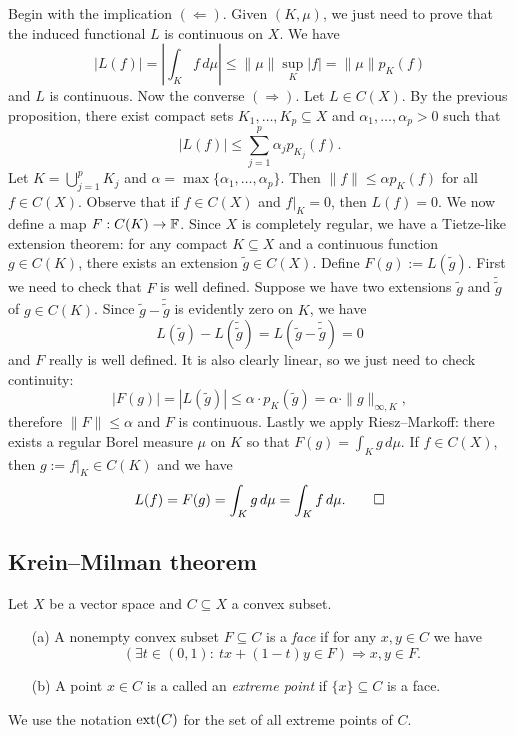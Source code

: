 \begin{myproof}
  Begin with the implication $(\Leftarrow)$. Given $(K, \mu)$, we just need to prove that the induced 
  functional $L$ is continuous on $X$. We have 
  $$|L(f)| = \left| \int_K f\, d\mu \right| \leq \|\mu\| \sup_K |f| = \|\mu\| p_K (f)$$
  and $L$ is continuous. Now the converse $(\Rightarrow)$.
  Let $L \in C(X)$. By the previous proposition, there exist compact sets 
  $K_1, \dots, K_p \subseteq X$ and $\alpha_1, \dots, \alpha_p > 0$ such that 
  $$|L(f)| \leq \sum_{j = 1} ^p \alpha_j p_{K_j} (f).$$
  Let $K = \bigcup_{j = 1} ^p K_j$ and $\alpha = \max \{\alpha_1, \dots, \alpha_p\}$.
  Then $\|f\| \leq \alpha p_K (f)$ for all $f \in C(X)$.
  Observe that if $f \in C(X)$ and $f \big|_K = 0$, then $L(f) = 0$.
  We now define a map $F: C(K) \to \mathbb {F}$. 
  Since $X$ is completely regular, we have a Tietze-like extension theorem: for any compact $K \subseteq X$ and a continuous function $g \in C(K)$,
  there exists an extension $\widetilde{g} \in C(X)$.
  Define $F(g) := L(\widetilde{g})$.
  First we need to check that $F$ is well defined. Suppose we have two extensions $\widetilde{g}$ and $\widetilde{\widetilde{g}}$
  of $g \in C(K)$. Since $\widetilde{g} - \widetilde{\widetilde{g}}$ is evidently zero on $K$, we have 
  $$L(\widetilde{g}) - L(\widetilde{\widetilde{g}}) = L(\widetilde{g} - \widetilde{\widetilde{g}}) = 0$$
  and $F$ really is well defined. It is also clearly linear, so we just need to check continuity:
  $$|F(g)| = |L(\widetilde{g})| \leq \alpha \cdot p_K (\widetilde{g}) = \alpha \cdot \|g\|_{\infty, K},$$
  therefore $\|F\| \leq \alpha$ and $F$ is continuous. Lastly we apply Riesz--Markoff: there exists a regular Borel measure $\mu$ on $K$
  so that $F(g) = \int_K g\, d\mu.$ If $f \in C(X)$, then $g := f\big|_K \in C(K)$
  and we have 
  \begin{equation*}
    L(f) = F(g) = \int_K g\, d\mu = \int_K f \, d\mu. \qedhere
  \end{equation*}
\end{myproof}

\subsection{Krein--Milman theorem}

\begin{definition}
  Let $X$ be a vector space and $C \subseteq X$ a convex subset.
  \begin{itemize}
    \item[(a)] A nonempty convex subset $F \subseteq C$ is a \emph{face} if for any $x, y \in C$ we have
    $$(\exists t \in (0, 1):\ tx + (1 - t)y \in F) \Rightarrow x, y \in F.$$
    \item[(b)] A point $x \in C$ is a called an \emph{extreme point} if $\{x\} \subseteq C$ is a face.  
  \end{itemize}
  We use the notation $\operatorname{ext} (C)$ for the set of all extreme points of $C$.
\end{definition}

